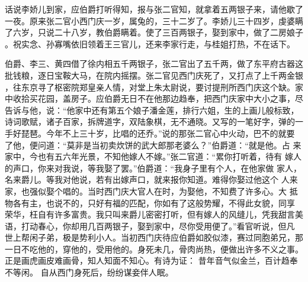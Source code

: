 话说李娇儿到家，应伯爵打听得知，报与张二官知，就拿着五两银子来，请他歇了
一夜。原来张二官小西门庆一岁，属兔的，三十二岁了。李娇儿三十四岁，虔婆瞒
了六岁，只说二十八岁，教伯爵瞒着。使了三百两银子，娶到家中，做了二房娘子
。祝实念、孙寡嘴依旧领着王三官儿，还来李家行走，与桂姐打热，不在话下。

伯爵、李三、黄四借了徐内相五千两银子，张二官出了五千两，做了东平府古器这
批钱粮，逐日宝鞍大马，在院内摇摆。张二官见西门庆死了，又打点了上千两金银
，往东京寻了枢密院郑皇亲人情，对堂上朱太尉说，要讨提刑所西门庆这个缺。家
中收拾买花园，盖房子。应伯爵无日不在他那边趋奉，把西门庆家中大小之事，尽
告诉与他，说：“他家中还有第五个娘子潘金莲，排行六姐，生的上画儿般标致，
诗词歌赋，诸子百家，拆牌道字，双陆象棋，无不通晓。又写的一笔好字，弹的一
手好琵琶。今年不上三十岁，比唱的还乔。”说的那张二官心中火动，巴不的就要
了他，便问道：“莫非是当初卖炊饼的武大郎那老婆么？”伯爵道：“就是他。占
来家中，今也有五六年光景，不知他嫁人不嫁。”张二官道：“累你打听着，待有
嫁人的声口，你来对我说，等我娶了罢。”伯爵道：“我身子里有个人，在他家做
家人，名来爵儿。等我对他说，若有出嫁声口，就来报你知道。难得你娶过他这个
人来家，也强似娶个唱的。当时西门庆大官人在时，为娶他，不知费了许多心。大
抵物各有主，也说不的，只好有福的匹配，你如有了这般势耀，不得此女貌，同享
荣华，枉自有许多富贵。我只叫来爵儿密密打听，但有嫁人的风缝儿，凭我甜言美
语，打动春心，你却用几百两银子，娶到家中，尽你受用便了。”看官听说，但凡
世上帮闲子弟，极是势利小人。当初西门庆待应伯爵如胶似漆，赛过同胞弟兄，那
一日不吃他的，穿他的，受用他的。身死未几，骨肉尚热，便做出许多不义之事。
正是画虎画皮难画骨，知人知面不知心。有诗为证：
昔年音气似金兰，百计趋奉不等闲。
自从西门身死后，纷纷谋妾伴人眠。